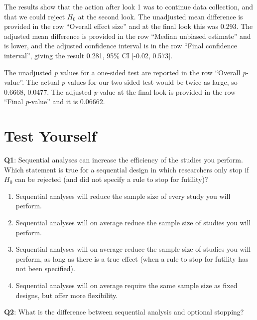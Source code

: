 \documentclass[
  oneside]{krantz}
\providecommand{\tightlist}{%
  \setlength{\itemsep}{0pt}\setlength{\parskip}{0pt}}
\begin{document}
The results show that the action after look 1 was to continue data collection, and that we could reject \(H_0\) at the second look. The unadjusted mean difference is provided in the row ``Overall effect size'' and at the final look this was 0.293. The adjusted mean difference is provided in the row ``Median unbiased estimate'' and is lower, and the adjusted confidence interval is in the row ``Final confidence interval'', giving the result 0.281, 95\% CI {[}-0.02, 0.573{]}.

The unadjusted \emph{p} values for a one-sided test are reported in the row ``Overall \emph{p}-value''. The actual \emph{p} values for our two-sided test would be twice as large, so 0.6668, 0.0477. The adjusted \emph{p}-value at the final look is provided in the row ``Final \emph{p}-value'' and it is 0.06662.

\hypertarget{test-yourself-8}{%
\section{Test Yourself}\label{test-yourself-8}}

\textbf{Q1}: Sequential analyses can increase the efficiency of the studies you perform. Which statement is true for a sequential design in which researchers only stop if \(H_0\) can be rejected (and did not specify a rule to stop for futility)?

\begin{enumerate}
\def\labelenumi{\Alph{enumi})}
\tightlist
\item
  Sequential analyses will reduce the sample size of every study you will perform.
\item
  Sequential analyses will on average reduce the sample size of studies you will perform.
\item
  Sequential analyses will on average reduce the sample size of studies you will perform, as long as there is a true effect (when a rule to stop for futility has not been specified).
\item
  Sequential analyses will on average require the same sample size as fixed designs, but offer more flexibility.
\end{enumerate}

\textbf{Q2}: What is the difference between sequential analysis and optional stopping?
\end{document}
